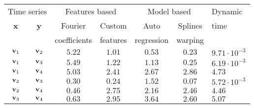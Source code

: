\begin{tabular}{ccccccl}
    \toprule
    \multicolumn{2}{c}{Time series} & \multicolumn{2}{c}{Features based} & \multicolumn{2}{c}{Model based} & Dynamic \\
    \textbf{x} & \textbf{y} & Fourier & Custom & Auto & Splines & time \\
    & & coefficients & features & regression & warping \\
 \otoprule
    $\textbf{v}_{1}$ & $\textbf{v}_{2}$ & $5.22$ & $1.01$ & $0.53$ & $0.23$ & $9.71 \cdot 10^{-3}$ \\
    $\textbf{v}_{1}$ & $\textbf{v}_{3}$ & $5.49$ & $1.22$ & $1.13$ & $0.25$ & $6.19 \cdot 10^{-3}$ \\
    $\textbf{v}_{1}$ & $\textbf{v}_{4}$ & $5.03$ & $2.41$ & $2.67$ & $2.86$ & $4.73$ \\
    $\textbf{v}_{2}$ & $\textbf{v}_{3}$ & $0.30$ & $0.24$ & $1.52$ & $0.07$ & $5.72 \cdot 10^{-3}$ \\
    $\textbf{v}_{2}$ & $\textbf{v}_{4}$ & $0.46$ & $2.75$ & $2.16$ & $2.46$ & $4.46$ \\
    $\textbf{v}_{3}$ & $\textbf{v}_{4}$ & $0.63$ & $2.95$ & $3.64$ & $2.60$ & $5.07$ \\
    \bottomrule
\end{tabular}
